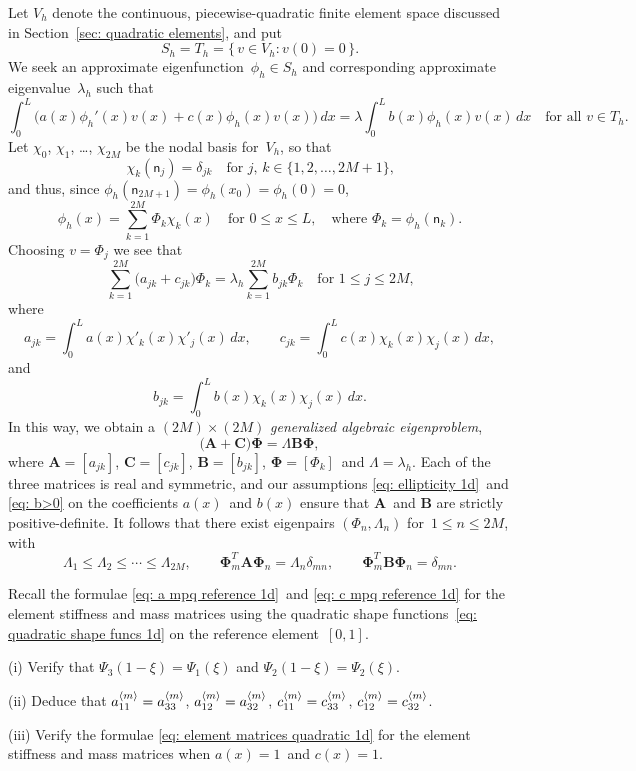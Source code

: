 Let $V_h$ denote the continuous, piecewise-quadratic finite element space 
discussed in Section~\ref{sec: quadratic elements}, and put
\[
S_h=T_h=\{\,v\in V_h:v(0)=0\,\}.
\]
We seek an approximate eigenfunction~$\phi_h\in S_h$ and corresponding 
approximate eigenvalue~$\lambda_h$ such that
\[
\int_0^L\bigl(a(x)\phi_h'(x)v(x)+c(x)\phi_h(x)v(x)\bigr)\,dx
	=\lambda\int_0^Lb(x)\phi_h(x)v(x)\,dx
\quad\text{for all $v\in T_h$.}
\]
Let $\chi_0$, $\chi_1$, \ldots, $\chi_{2M}$ be the nodal basis for~$V_h$, so 
that
\[
\chi_k(\mathsf{n}_j)=\delta_{jk}
	\quad\text{for $j$, $k\in\{1,2,\ldots, 2M+1\}$,}
\]
and thus, since $\phi_h(\mathsf{n}_{2M+1})=\phi_h(x_0)=\phi_h(0)=0$,
\[
\phi_h(x)=\sum_{k=1}^{2M}\Phi_k\chi_k(x)
	\quad\text{for $0\le x\le L$},
	\quad\text{where $\Phi_k=\phi_h(\mathsf{n}_k)$.}
\]
Choosing $v=\Phi_j$ we see that
\[
\sum_{k=1}^{2M}\bigl(a_{jk}+c_{jk}\bigr)\Phi_k
	=\lambda_h\sum_{k=1}^{2M}b_{jk}\Phi_k\quad\text{for $1\le j\le 2M$,}
\]
where
\[
a_{jk}=\int_0^La(x)\chi'_k(x)\chi'_j(x)\,dx,\qquad
c_{jk}=\int_0^Lc(x)\chi_k(x)\chi_j(x)\,dx,
\]
and
\[
b_{jk}=\int_0^Lb(x)\chi_k(x)\chi_j(x)\,dx.
\]
In this way, we obtain a $(2M)\times(2M)$ \emph{generalized algebraic 
eigenproblem},
\[
\bigl(\boldsymbol{A}+\boldsymbol{C}\bigr)\boldsymbol{\Phi}
	=\Lambda\boldsymbol{B}\boldsymbol{\Phi},
\]
where $\boldsymbol{A}=[a_{jk}]$, $\boldsymbol{C}=[c_{jk}]$, 
$\boldsymbol{B}=[b_{jk}]$, $\boldsymbol{\Phi}=[\Phi_k]$~and 
$\Lambda=\lambda_h$.  Each of the three matrices is real and symmetric, and our 
assumptions \eqref{eq: ellipticity 1d}~and \eqref{eq: b>0} on the coefficients 
$a(x)$~and $b(x)$ ensure that $\boldsymbol{A}$~and $\boldsymbol{B}$ are 
strictly positive-definite.  It follows that there exist eigenpairs 
$(\Phi_n,\Lambda_n)$ for~$1\le n\le 2M$, with
\[
\Lambda_1\le\Lambda_2\le\cdots\le\Lambda_{2M},\qquad
\boldsymbol{\Phi}_m^T\boldsymbol{A}\boldsymbol{\Phi}_n=\Lambda_n\delta_{mn},
\qquad
\boldsymbol{\Phi}_m^T\boldsymbol{B}\boldsymbol{\Phi}_n=\delta_{mn}.
\]

\begin{Exercises}
\exercise
Recall the formulae \eqref{eq: a mpq reference 1d}~and
\eqref{eq: c mpq reference 1d} for the element stiffness and mass matrices using 
the quadratic shape functions~\eqref{eq: quadratic shape funcs 1d} on the 
reference element~$[0,1]$. 
\begin{description}
\item{(i)} Verify that $\Psi_3(1-\xi)=\Psi_1(\xi)$ and 
$\Psi_2(1-\xi)=\Psi_2(\xi)$.
\item{(ii)} Deduce that
$a^{\langle m\rangle}_{11}=a^{\langle m\rangle}_{33}$, $a^{\langle m\rangle}_{12}=a^{\langle m\rangle}_{32}$,
$c^{\langle m\rangle}_{11}=c^{\langle m\rangle}_{33}$, $c^{\langle m\rangle}_{12}=c^{\langle m\rangle}_{32}$.
\item{(iii)} Verify the formulae \eqref{eq: element matrices quadratic 1d}
for the element stiffness and mass matrices when $a(x)=1$~and $c(x)=1$.
\end{description}

\end{Exercises}
